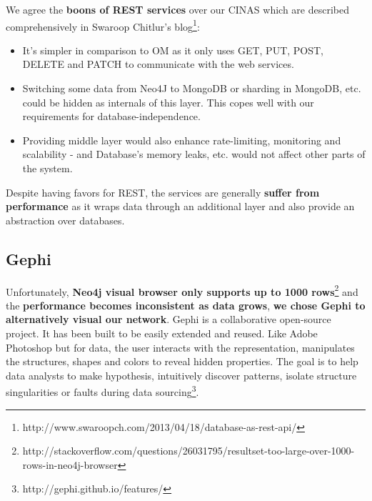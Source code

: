 \documentclass{article}
\begin{document}
We agree the \textbf{boons of REST services} over our CINAS which are described comprehensively in Swaroop Chitlur's blog\footnote{http://www.swaroopch.com/2013/04/18/database-as-rest-api/}:
\begin{itemize}
\item It's simpler in comparison to OM as it only uses GET, PUT, POST, DELETE and PATCH to communicate with the web services.
\item  Switching some data from Neo4J to MongoDB or sharding in MongoDB, etc. could be hidden as internals of this layer. This copes well with our requirements for database-independence.
\item Providing middle layer would also enhance rate-limiting, monitoring and scalability - and Database's memory leaks, etc. would not affect other parts of the system.
\end{itemize}

Despite having favors for REST, the services are generally \textbf{suffer from performance} as it wraps data through an additional layer and also provide an abstraction over databases.

\subsection{Gephi}
Unfortunately, \textbf{Neo4j visual browser only supports up to 1000 rows}\footnote{http://stackoverflow.com/questions/26031795/resultset-too-large-over-1000-rows-in-neo4j-browser} and the \textbf{performance becomes inconsistent as data grows}, \textbf{we chose Gephi to alternatively visual our network}. Gephi is a collaborative open-source project. It has been built to be easily extended and reused. Like Adobe Photoshop but for data, the user interacts with the representation, manipulates the structures, shapes and colors to reveal hidden properties. The goal is to help data analysts to make hypothesis, intuitively discover patterns, isolate structure singularities or faults during data sourcing\footnote{http://gephi.github.io/features/}.

\end{document}
